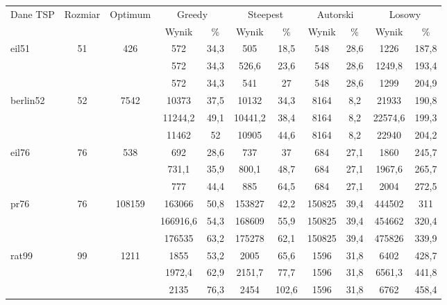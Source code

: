\begin{adjustwidth}{-1in}{-1in}%

\begin{center}

\begin{tabular}{lcccccccccc}

\toprule
 \multirow{2}{*}{Dane TSP} & \multirow{2}{*}{Rozmiar} & \multirow{2}{*}{Optimum} & \multicolumn{2}{c}{Greedy} & \multicolumn{2}{c}{Steepest} & \multicolumn{2}{c}{Autorski} & \multicolumn{2}{c}{Losowy} \\
 & & & Wynik & \% & Wynik & \% & Wynik & \% & Wynik & \% \\
\toprule
\multirow{3}{*}{eil51} & \multirow{3}{*}{51} & \multirow{3}{*}{426} & 572 & 34,3  & 505 & 18,5  & 548 & 28,6  & 1226 & 187,8 \\
 & &  & 572 & 34,3  & 526,6 & 23,6  & 548 & 28,6  & 1249,8 & 193,4 \\
 & &  & 572 & 34,3  & 541 & 27  & 548 & 28,6  & 1299 & 204,9 \\
\midrule
\multirow{3}{*}{berlin52} & \multirow{3}{*}{52} & \multirow{3}{*}{7542} & 10373 & 37,5  & 10132 & 34,3  & 8164 & 8,2  & 21933 & 190,8 \\
 & &  & 11244,2 & 49,1  & 10441,2 & 38,4  & 8164 & 8,2  & 22574,6 & 199,3 \\
 & &  & 11462 & 52  & 10905 & 44,6  & 8164 & 8,2  & 22940 & 204,2 \\
\midrule
\multirow{3}{*}{eil76} & \multirow{3}{*}{76} & \multirow{3}{*}{538} & 692 & 28,6  & 737 & 37  & 684 & 27,1  & 1860 & 245,7 \\
 & &  & 731,1 & 35,9  & 800,1 & 48,7  & 684 & 27,1  & 1967,6 & 265,7 \\
 & &  & 777 & 44,4  & 885 & 64,5  & 684 & 27,1  & 2004 & 272,5 \\
\midrule
\multirow{3}{*}{pr76} & \multirow{3}{*}{76} & \multirow{3}{*}{108159} & 163066 & 50,8  & 153827 & 42,2  & 150825 & 39,4  & 444502 & 311 \\
 & &  & 166916,6 & 54,3  & 168609 & 55,9  & 150825 & 39,4  & 454662 & 320,4 \\
 & &  & 176535 & 63,2  & 175278 & 62,1  & 150825 & 39,4  & 475826 & 339,9 \\
\midrule
\multirow{3}{*}{rat99} & \multirow{3}{*}{99} & \multirow{3}{*}{1211} & 1855 & 53,2  & 2005 & 65,6  & 1596 & 31,8  & 6402 & 428,7 \\
 & &  & 1972,4 & 62,9  & 2151,7 & 77,7  & 1596 & 31,8  & 6561,3 & 441,8 \\
 & &  & 2135 & 76,3  & 2454 & 102,6  & 1596 & 31,8  & 6762 & 458,4 \\

\end{tabular}
\end{center}
\end{adjustwidth}

